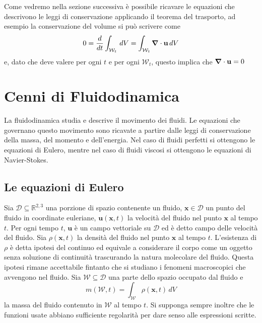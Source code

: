 Come vedremo nella sezione successiva è possibile ricavare le equazioni che descrivono le leggi di conservazione applicando il teorema del trasporto, ad esempio la conservazione del volume si può scrivere come
\begin{equation}
0 = \frac{d}{dt}\int_{\mathcal{W}_t}\,dV = \int_{\mathcal{W}_t} \boldsymbol{\nabla} \cdot \mathbf{u}\,dV
\end{equation}
e, dato che deve valere per ogni $t$ e per ogni $\mathcal{W}_t$, questo implica che $\boldsymbol{\nabla} \cdot \mathbf{u} = 0$

\section{Cenni di Fluidodinamica}

La fluidodinamica studia e descrive il movimento dei fluidi. Le equazioni che governano questo movimento sono ricavate a partire dalle leggi di conservazione della massa, del momento e dell'energia. Nel caso di fluidi perfetti si ottengono le equazioni di Eulero, mentre nel caso di fluidi viscosi si ottengono le equazioni di Navier-Stokes.

\subsection{Le equazioni di Eulero}

Sia $\mathcal{D} \subseteq \mathbb{R}^{2,3}$ una porzione di spazio contenente un fluido, $\mathbf{x} \in \mathcal{D}$ un punto del fluido in coordinate euleriane, $\mathbf{u}(\mathbf{x},t)$ la velocità del fluido nel punto $\mathbf{x}$ al tempo $t$. Per ogni tempo $t$, $\mathbf{u}$ è un campo vettoriale su $\mathcal{D}$ ed è detto campo delle velocità del fluido. Sia $\rho(\mathbf{x},t)$ la densità del fluido nel punto $\mathbf{x}$ al tempo $t$.  L'esistenza di $\rho$ è detta ipotesi del continuo ed equivale a considerare il corpo come un oggetto senza soluzione di continuità trascurando la natura molecolare del fluido. Questa ipotesi rimane accettabile fintanto che si studiano i fenomeni macroscopici che avvengono nel fluido. Sia $\mathcal{W} \subseteq \mathcal{D}$ una parte dello spazio occupato dal fluido e
\begin{equation*}
m(\mathcal{W},t)= \int_{\mathcal{W}}\rho(\mathbf{x},t) \, dV
\end{equation*}
la massa del fluido contenuto in $\mathcal{W}$ al tempo $t$. Si supponga sempre inoltre che le funzioni usate abbiano sufficiente regolarità per dare senso alle espressioni scritte. 

